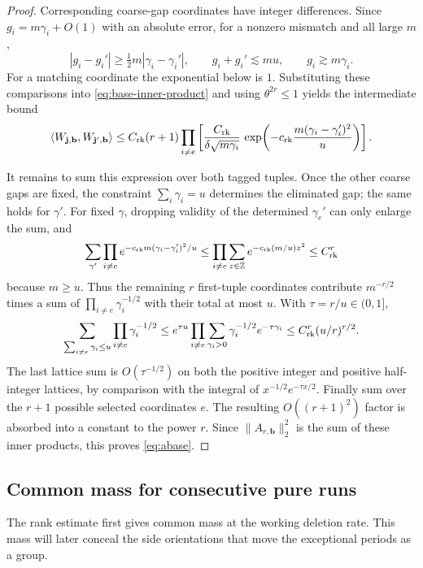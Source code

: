 \begin{proof}
Corresponding coarse-gap coordinates have integer differences. Since
\(g_i=m\gamma_i+O(1)\) with an absolute error, for a nonzero mismatch and all large \(m\),
\[
 |g_i-g_i'|\ge\tfrac12m|\gamma_i-\gamma_i'|,
 \qquad g_i+g_i'\lesssim mu,\qquad g_i\gtrsim m\gamma_i.
\]
For a matching coordinate the exponential below is \(1\). Substituting these comparisons into \eqref{eq:base-inner-product} and using \(\theta^{2r}\le1\) yields the intermediate bound
\begin{equation}\label{eq:base-coarse-inner}
 \langle W_{\mathbf j,\mathbf b},W_{\mathbf j',\mathbf b}\rangle
 \le C_{\rm rk}(r+1)
 \prod_{i\ne e}\left[
   \frac{C_{\rm rk}}{\delta\sqrt{m\gamma_i}}\,
   \exp\!\left(-c_{\rm rk}
        \frac{m(\gamma_i-\gamma_i')^2}{u}\right)\right].
\end{equation}

It remains to sum this expression over both tagged tuples. Once the other coarse gaps are fixed, the constraint \(\sum_i\gamma_i=u\) determines the eliminated gap; the same holds for \(\gamma'\). For fixed \(\gamma\), dropping validity of the determined \(\gamma_e'\) can only enlarge the sum, and
\[
 \sum_{\gamma'}\prod_{i\ne e}
       e^{-c_{\rm rk}m(\gamma_i-\gamma_i')^2/u}
 \le\prod_{i\ne e}\sum_{z\in\mathbb Z}
       e^{-c_{\rm rk}(m/u)z^2}
 \le C_{\rm rk}^r
\]
because \(m\ge u\). Thus the remaining \(r\) first-tuple coordinates contribute \(m^{-r/2}\) times a sum of
\(\prod_{i\ne e}\gamma_i^{-1/2}\) with their total at most \(u\).
With \(\tau=r/u\in(0,1]\),
\[
 \sum_{\sum_{i\ne e}\gamma_i\le u}
       \prod_{i\ne e}\gamma_i^{-1/2}
 \le e^{\tau u}\prod_{i\ne e}
       \sum_{\gamma_i>0}\gamma_i^{-1/2}e^{-\tau\gamma_i}
 \le C_{\rm rk}^r(u/r)^{r/2}.
\]
The last lattice sum is \(O(\tau^{-1/2})\) on both the positive integer and positive half-integer lattices, by comparison with the integral of \(x^{-1/2}e^{-\tau x/2}\). Finally sum over the \(r+1\) possible selected coordinates \(e\). The resulting \(O((r+1)^2)\) factor is absorbed into a constant to the power \(r\). Since
\(\|A_{r,\mathbf b}\|_2^2\) is the sum of these inner products, this proves \eqref{eq:abase}.
\end{proof}

\subsection{Common mass for consecutive pure runs}

The rank estimate first gives common mass at the working deletion rate. This mass will later conceal the side orientations that move the exceptional periods as a group.

